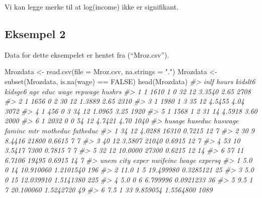 \documentclass[
]{article}
\newenvironment{Shaded}{\begin{snugshade}}{\end{snugshade}}
\newcommand{\AttributeTok}[1]{\textcolor[rgb]{0.77,0.63,0.00}{#1}}
\newcommand{\CommentTok}[1]{\textcolor[rgb]{0.56,0.35,0.01}{\textit{#1}}}
\newcommand{\ConstantTok}[1]{\textcolor[rgb]{0.00,0.00,0.00}{#1}}
\newcommand{\FunctionTok}[1]{\textcolor[rgb]{0.00,0.00,0.00}{#1}}
\newcommand{\NormalTok}[1]{#1}
\newcommand{\OtherTok}[1]{\textcolor[rgb]{0.56,0.35,0.01}{#1}}
\newcommand{\SpecialCharTok}[1]{\textcolor[rgb]{0.00,0.00,0.00}{#1}}
\newcommand{\StringTok}[1]{\textcolor[rgb]{0.31,0.60,0.02}{#1}}
\begin{document}
Vi kan legge merke til at log(income) ikke er signifikant.

\hypertarget{eksempel-2}{%
\subsection{Eksempel 2}\label{eksempel-2}}

Data for dette eksempelet er hentet fra \citet{beckerECLR2021} (``Mroz.csv'').

\begin{Shaded}
\begin{Highlighting}[]
\NormalTok{Mrozdata }\OtherTok{\textless{}{-}} \FunctionTok{read.csv}\NormalTok{(}\AttributeTok{file =} \StringTok{\textquotesingle{}Mroz.csv\textquotesingle{}}\NormalTok{, }\AttributeTok{na.strings =} \StringTok{"."}\NormalTok{)}
\NormalTok{Mrozdata }\OtherTok{\textless{}{-}} \FunctionTok{subset}\NormalTok{(Mrozdata, }\FunctionTok{is.na}\NormalTok{(wage) }\SpecialCharTok{==} \ConstantTok{FALSE}\NormalTok{) }
\FunctionTok{head}\NormalTok{(Mrozdata)}
\CommentTok{\#\textgreater{}   inlf hours kidslt6 kidsge6 age educ   wage repwage hushrs}
\CommentTok{\#\textgreater{} 1    1  1610       1       0  32   12 3.3540    2.65   2708}
\CommentTok{\#\textgreater{} 2    1  1656       0       2  30   12 1.3889    2.65   2310}
\CommentTok{\#\textgreater{} 3    1  1980       1       3  35   12 4.5455    4.04   3072}
\CommentTok{\#\textgreater{} 4    1   456       0       3  34   12 1.0965    3.25   1920}
\CommentTok{\#\textgreater{} 5    1  1568       1       2  31   14 4.5918    3.60   2000}
\CommentTok{\#\textgreater{} 6    1  2032       0       0  54   12 4.7421    4.70   1040}
\CommentTok{\#\textgreater{}   husage huseduc huswage faminc    mtr motheduc fatheduc}
\CommentTok{\#\textgreater{} 1     34      12  4.0288  16310 0.7215       12        7}
\CommentTok{\#\textgreater{} 2     30       9  8.4416  21800 0.6615        7        7}
\CommentTok{\#\textgreater{} 3     40      12  3.5807  21040 0.6915       12        7}
\CommentTok{\#\textgreater{} 4     53      10  3.5417   7300 0.7815        7        7}
\CommentTok{\#\textgreater{} 5     32      12 10.0000  27300 0.6215       12       14}
\CommentTok{\#\textgreater{} 6     57      11  6.7106  19495 0.6915       14        7}
\CommentTok{\#\textgreater{}   unem city exper  nwifeinc     lwage expersq}
\CommentTok{\#\textgreater{} 1  5.0    0    14 10.910060 1.2101540     196}
\CommentTok{\#\textgreater{} 2 11.0    1     5 19.499980 0.3285121      25}
\CommentTok{\#\textgreater{} 3  5.0    0    15 12.039910 1.5141380     225}
\CommentTok{\#\textgreater{} 4  5.0    0     6  6.799996 0.0921233      36}
\CommentTok{\#\textgreater{} 5  9.5    1     7 20.100060 1.5242720      49}
\CommentTok{\#\textgreater{} 6  7.5    1    33  9.859054 1.5564800    1089}
\end{Highlighting}
\end{Shaded}
\end{document}
